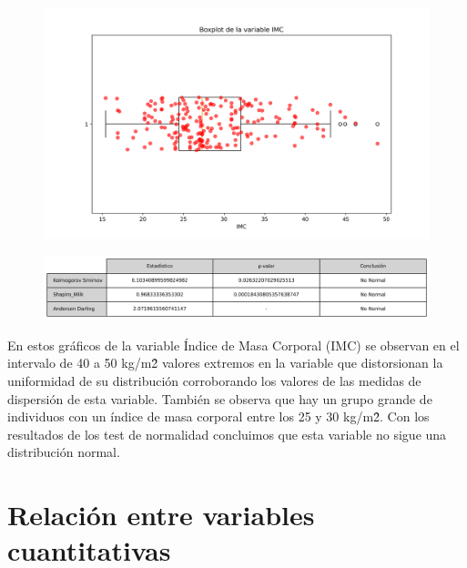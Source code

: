 \documentclass[a4paper, 12pt]{article}
\begin{document}
\begin{figure}[H]
    \centering
    \includegraphics[width=1\textwidth]{img/Boxplot/Boxplt_IMC.png}
\end{figure}

\begin{figure}[H]
    \centering
    \includegraphics[width=1\textwidth]{img/Tablas/test_normalidad_IMC.png}
\end{figure}


En estos gráficos de la variable Índice de Masa Corporal (IMC) se observan en el intervalo de 40 a 50 kg/m\^2 valores extremos en 
la variable que distorsionan la uniformidad de su distribución corroborando los valores de las medidas de dispersión de esta variable. 
También se observa que hay un grupo grande de individuos con un índice de masa corporal entre los 25 y 30 kg/m\^2. Con los resultados 
de los test de normalidad concluimos que esta variable no sigue una distribución normal.

\newpage


\section{Relación entre variables cuantitativas}
\end{document}
